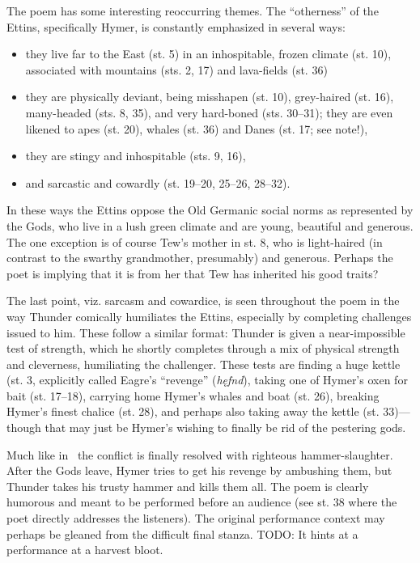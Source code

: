 \sectionline

The poem has some interesting reoccurring themes.  The “otherness” of the Ettins, specifically Hymer, is constantly emphasized in several ways:
\begin{itemize}
  \item they live far to the East (st. 5) in an inhospitable, frozen climate (st. 10), associated with mountains (sts. 2, 17) and lava-fields (st. 36)
  \item they are physically deviant, being misshapen (st. 10), grey-haired (st. 16), many-headed (sts. 8, 35), and very hard-boned (sts. 30–31); they are even likened to apes (st. 20), whales (st. 36) and Danes (st. 17; see note!),
  \item they are stingy and inhospitable (sts. 9, 16),
  \item and sarcastic and cowardly (st. 19–20, 25–26, 28–32).
\end{itemize}

In these ways the Ettins oppose the Old Germanic social norms as represented by the Gods, who live in a lush green climate and are young, beautiful and generous.  The one exception is of course Tew’s mother in st. 8, who is light-haired (in contrast to the swarthy grandmother, presumably) and generous.  Perhaps the poet is implying that it is from her that Tew has inherited his good traits?

The last point, viz. sarcasm and cowardice, is seen throughout the poem in the way Thunder comically humiliates the Ettins, especially by completing challenges issued to him.  These follow a similar format: Thunder is given a near-impossible test of strength, which he shortly completes through a mix of physical strength and cleverness, humiliating the challenger.  These tests are finding a huge kettle (st. 3, explicitly called Eagre’s “revenge” (\emph{hęfnd}), taking one of Hymer’s oxen for bait (st. 17–18), carrying home Hymer’s whales and boat (st. 26), breaking Hymer’s finest chalice (st. 28), and perhaps also taking away the kettle (st. 33)—though that may just be Hymer’s wishing to finally be rid of the pestering gods.

Much like in \Thrymskvida\ the conflict is finally resolved with righteous hammer-slaughter.  After the Gods leave, Hymer tries to get his revenge by ambushing them, but Thunder takes his trusty hammer and kills them all.  The poem is clearly humorous and meant to be performed before an audience (see st. 38 where the poet directly addresses the listeners).  The original performance context may perhaps be gleaned from the difficult final stanza. TODO: It hints at a performance at a harvest bloot.

